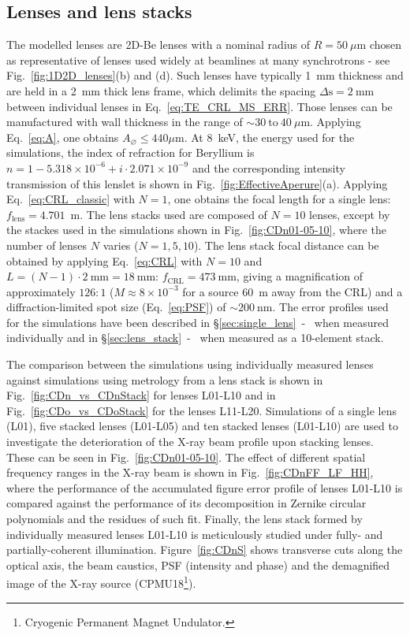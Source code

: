 \begin{refsection}
\section{Lenses and lens stacks}\label{sec:lens_descripiton}
The modelled lenses are 2D-Be lenses with a nominal radius of $R=50~\mu\text{m}$ chosen as representative of lenses used widely at beamlines at many synchrotrons - see Fig.~\ref{fig:1D2D_lenses}(b) and (d). Such lenses have typically 1~mm thickness and are held in a 2~mm thick lens frame, which delimits the spacing $\Delta\text{s}=2~$mm between individual lenses in Eq.~\ref{eq:TE_CRL_MS_ERR}. Those lenses can be manufactured with wall thickness in the range of $\sim30~\text{to}~40~\mu\text{m}$. Applying Eq.~\ref{eq:A}, one obtains $A_{\diameter}\le440 \mu\text{m}$. At 8~keV, the energy used for the simulations, the index of refraction for Beryllium is $n=1-5.318\times10^{-6}+i\cdot2.071\times10^{-9}$ and the corresponding intensity transmission of this lenslet is shown in Fig.~\ref{fig:EffectiveAperure}(a). Applying Eq.~\ref{eq:CRL_classic} with $N=1$, one obtains the focal length for a single lens: $f_{\text{lens}}=4.701$~m. The lens stacks used are composed of $N=10$ lenses, except by the stackes used in the simulations shown in Fig.~\ref{fig:CDn01-05-10}, where the number of lenses $N$ varies ($N=1,5,10$).  The lens stack focal distance can be obtained by applying Eq.~\ref{eq:CRL} with $N=10$ and $L=(N-1)\cdot2~\text{mm}=18~\text{mm}$: $f_{\text{CRL}}=473~{\text{mm}}$, giving a magnification of approximately $126:1$ ($M\approx8\times10^{-3}$ for a source 60~m away from the CRL) and a diffraction-limited spot size (Eq.~\ref{eq:PSF}) of $\sim200~\text{nm}$. The error profiles used for the simulations have been described in \S\ref{sec:single_lens}~-~\textit{} when measured individually and in \S\ref{sec:lens_stack}~-~\textit{} when measured as a 10-element stack.

The comparison between the simulations using individually measured lenses against simulations using metrology from a lens stack is shown in Fig.~\ref{fig:CDn_vs_CDnStack} for lenses L01-L10 and in Fig.~\ref{fig:CDo_vs_CDoStack} for the lenses L11-L20. Simulations of a single lens (L01), five stacked lenses (L01-L05) and ten stacked lenses (L01-L10) are used to investigate the deterioration of the X-ray beam profile upon stacking lenses. These can be seen in Fig.~\ref{fig:CDn01-05-10}. The effect of different spatial frequency ranges in the X-ray beam is shown in Fig.~\ref{fig:CDnFF_LF_HH}, where the performance of the accumulated figure error profile of lenses L01-L10 is compared against the performance of its decomposition in Zernike circular polynomials and the residues of such fit. Finally, the lens stack formed by individually measured lenses L01-L10 is meticulously studied under fully- and partially-coherent illumination. Figure~\ref{fig:CDnS} shows transverse cuts along the optical axis, the beam caustics, PSF (intensity and phase) and the demagnified image of the X-ray source (CPMU18\footnote{Cryogenic Permanent Magnet Undulator.}).


\end{refsection}
